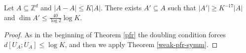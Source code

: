 \begin{theorem}\label{weak-pfr-int}\leanok
Let $A\subseteq \mathbb{Z}^d$ and $\lvert A-A\rvert\leq K\lvert A\rvert$.
There exists $A'\subseteq A$ such that $\lvert A'\rvert \geq K^{-17}\lvert
A\rvert$ and $\dim A' \leq \frac{40}{\log 2}\log K$.
\end{theorem}
\begin{proof}\leanok
{}
As in the beginning of Theorem \ref{pfr} the doubling condition forces $d[U_A;U_A]\leq \log K$, and then we apply Theorem \ref{weak-pfr-symm}.
\end{proof}
